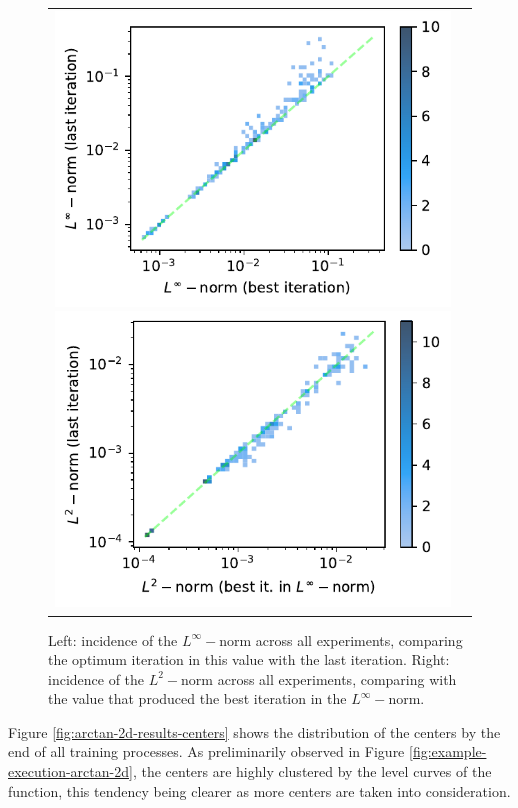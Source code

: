 \documentclass[12pt]{report} %
\begin{document}
\begin{figure}
  \hspace*{-2cm}
  \begin{tabular}{cc}
    \includegraphics[width=.6\textwidth]{imagenes/experiments/2d/statistical_2d_full_scheduler_interpolation/arctan_2d/incidence_of_linf_arctan_paper_2d.pdf}
    \includegraphics[width=.6\textwidth]{imagenes/experiments/2d/statistical_2d_full_scheduler_interpolation/arctan_2d/incidence_of_l2_arctan_paper_2d.pdf}
  \end{tabular}
  \caption{Left: incidence of the $L^\infty-$norm across all experiments, comparing the optimum iteration in this value with the last iteration. Right: incidence of the $L^2-$norm across all experiments, comparing with the value that produced the best iteration in the $L^\infty-$norm.}
  \label{fig:arctan-2d-results-incidence-l-norms}
\end{figure}


Figure \ref{fig:arctan-2d-results-centers} shows the distribution of the centers by the end of all training processes. As preliminarily observed in Figure \ref{fig:example-execution-arctan-2d}, the centers are highly clustered by the level curves of the function, this tendency being clearer as more centers are taken into consideration.
\end{document}
